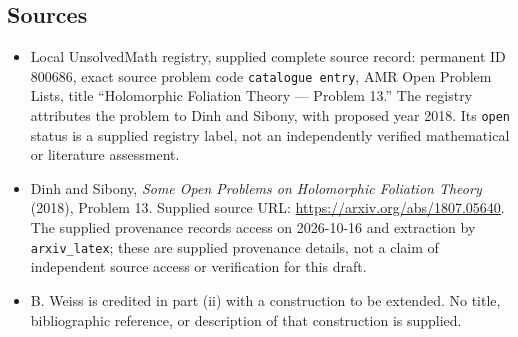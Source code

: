 \documentclass[11pt]{article}
\begin{document}
\subsection{Sources}
\begin{itemize}
\item Local UnsolvedMath registry, supplied complete source record: permanent ID \(800686\), exact source problem code \texttt{catalogue entry}, AMR Open Problem Lists, title ``Holomorphic Foliation Theory --- Problem 13.'' The registry attributes the problem to Dinh and Sibony, with proposed year 2018. Its \texttt{open} status is a supplied registry label, not an independently verified mathematical or literature assessment.
\item Dinh and Sibony, \emph{Some Open Problems on Holomorphic Foliation Theory} (2018), Problem 13. Supplied source URL: \url{https://arxiv.org/abs/1807.05640}. The supplied provenance records access on 2026-10-16 and extraction by \texttt{arxiv\_latex}; these are supplied provenance details, not a claim of independent source access or verification for this draft.
\item B. Weiss is credited in part (ii) with a construction to be extended. No title, bibliographic reference, or description of that construction is supplied.
\end{itemize}
\end{document}
